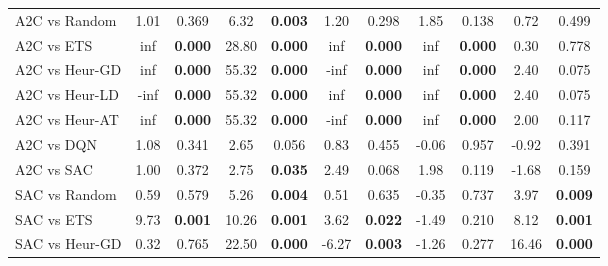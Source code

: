 \begin{tabular}{lcccccccccc}
	\midrule 
	A2C vs Random    & 1.01           & 0.369                  & 6.32           & \textbf{0.003}         & 1.20           & 0.298                  & 1.85           & 0.138                  & 0.72           & 0.499                  \\
	A2C vs ETS       & inf            & \textbf{0.000}         & 28.80          & \textbf{0.000}         & inf            & \textbf{0.000}         & inf            & \textbf{0.000}         & 0.30           & 0.778                  \\
	A2C vs Heur-GD   & inf            & \textbf{0.000}         & 55.32          & \textbf{0.000}         & -inf           & \textbf{0.000}         & inf            & \textbf{0.000}         & 2.40           & 0.075                  \\
	A2C vs Heur-LD   & -inf           & \textbf{0.000}         & 55.32          & \textbf{0.000}         & inf            & \textbf{0.000}         & inf            & \textbf{0.000}         & 2.40           & 0.075                  \\
	A2C vs Heur-AT   & inf            & \textbf{0.000}         & 55.32          & \textbf{0.000}         & -inf           & \textbf{0.000}         & inf            & \textbf{0.000}         & 2.00           & 0.117                  \\
	A2C vs DQN       & 1.08           & 0.341                  & 2.65           & 0.056                  & 0.83           & 0.455                  & -0.06          & 0.957                  & -0.92          & 0.391                  \\
	A2C vs SAC       & 1.00           & 0.372                  & 2.75           & \textbf{0.035}         & 2.49           & 0.068                  & 1.98           & 0.119                  & -1.68          & 0.159                  \\
	\midrule 
	SAC vs Random    & 0.59           & 0.579                  & 5.26           & \textbf{0.004}         & 0.51           & 0.635                  & -0.35          & 0.737                  & 3.97           & \textbf{0.009}         \\
	SAC vs ETS       & 9.73           & \textbf{0.001}         & 10.26          & \textbf{0.001}         & 3.62           & \textbf{0.022}         & -1.49          & 0.210                  & 8.12           & \textbf{0.001}         \\
	SAC vs Heur-GD   & 0.32           & 0.765                  & 22.50          & \textbf{0.000}         & -6.27          & \textbf{0.003}         & -1.26          & 0.277                  & 16.46          & \textbf{0.000}         \\

\end{tabular}
